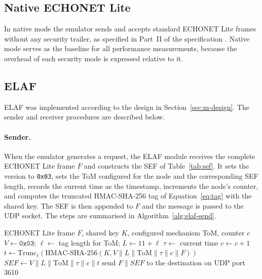 \subsection{Native ECHONET Lite}

In native mode the emulator sends and accepts standard ECHONET Lite frames without any security trailer, as specified in Part~II of the specification \citep{ECHONETPart2}. Native mode serves as the baseline for all performance measurements, because the overhead of each security mode is expressed relative to it.

\subsection{ELAF}
\label{sec:i-elaf}

ELAF was implemented according to the design in Section~\ref{sec:m-design}. The sender and receiver procedures are described below.

\paragraph{Sender.} When the emulator generates a request, the ELAF module receives the complete ECHONET Lite frame $F$ and constructs the SEF of Table~\ref{tab:sef}. It sets the version to \texttt{0x03}, sets the ToM configured for the node and the corresponding SEF length, records the current time as the timestamp, increments the node's counter, and computes the truncated HMAC-SHA-256 tag of Equation~\ref{eq:tag} with the shared key. The SEF is then appended to $F$ and the message is passed to the UDP socket. The steps are summarised in Algorithm~\ref{alg:elaf-send}.

\begin{algorithm}[htbp]
  \caption{ELAF message generation at the sender}
  \label{alg:elaf-send}
  \begin{algorithmic}[1]
    \Require ECHONET Lite frame $F$, shared key $K$, configured mechanism ToM, counter $c$
    \State $V \gets \texttt{0x03}$; $\ell \gets$ tag length for ToM; $L \gets 11 + \ell$
    \State $\tau \gets$ current time
    \State $c \gets c + 1$
    \State $t \gets \mathrm{Trunc}_{\ell}(\mathrm{HMAC\text{-}SHA\text{-}256}(K, V \| L \| \mathrm{ToM} \| \tau \| c \| F))$
    \State $\mathit{SEF} \gets V \| L \| \mathrm{ToM} \| \tau \| c \| t$
    \State send $F \| \mathit{SEF}$ to the destination on UDP port 3610
  \end{algorithmic}
\end{algorithm}

